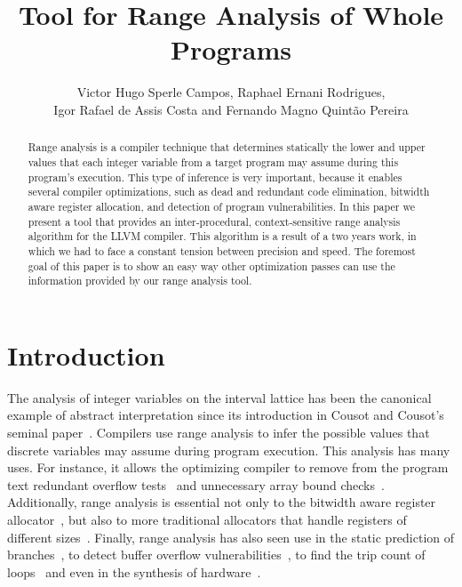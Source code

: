 \documentclass{paper}
\begin{document}
\lstset{language=, basicstyle=\small} 

\title{Tool for Range Analysis of Whole Programs}

\author{Victor Hugo Sperle Campos, Raphael Ernani Rodrigues, \\
Igor Rafael de Assis Costa and Fernando Magno Quint\~{a}o Pereira}

\address{UFMG -- 6627 Ant\^{o}nio Carlos Av, 31.270-010, Belo Horizonte, Brazil
}


\maketitle

\begin{abstract}
Range analysis is a compiler technique that determines statically the lower and
upper values that each integer variable from a target program may assume
during this program's execution.
This type of inference is very important, because it enables several compiler
optimizations, such as dead and redundant code elimination, bitwidth aware
register allocation, and detection of program vulnerabilities.
In this paper we present a tool that provides an inter-procedural, context-sensitive 
range analysis algorithm for the LLVM compiler. This algorithm is a result
of a two years work, in which we had to face a constant tension between precision 
and speed.
The foremost goal of this paper is to show an easy way other optimization passes
can use the information provided by our range analysis tool.
\end{abstract}

\section{Introduction}
\label{sec:intro}

The analysis of integer variables on the interval lattice has been the
canonical example of abstract interpretation since its introduction in
Cousot and Cousot's seminal paper~\cite{Cousot77}.
Compilers use range analysis to infer the possible values that discrete
variables may assume during program execution.
This analysis has many uses.
For instance, it allows the optimizing compiler to remove from the program text
redundant overflow tests~\cite{Sol11} and unnecessary array bound
checks~\cite{Bodik00}.
Additionally, range analysis is essential not only to the bitwidth aware
register allocator~\cite{Barik06,Tallam03}, but also to more traditional
allocators that handle registers of different
sizes~\cite{Kong98,Pereira08,Scholz02}.
Finally, range analysis has also seen use in the static prediction of
branches~\cite{Patterson95}, to detect buffer overflow
vulnerabilities~\cite{Simon08,Wagner00}, to find the trip count of
loops~\cite{Lokuciejewski09}
and even in the synthesis of hardware~\cite{Cong05,Lhairech10,Mahlke01}.
\end{document}
